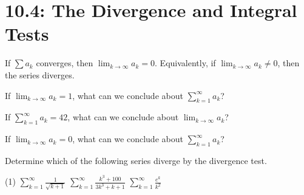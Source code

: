 \documentclass[../mathNotesPreamble]{subfiles}
\begin{document}
  \section{10.4: The Divergence and Integral Tests}

  \begin{thmBox*}
    If $\sum a_k$ converges, then $\displaystyle\lim_{k\to \infty} a_k=0$. Equivalently, if $\displaystyle\lim_{k\to \infty} a_k\neq 0$, then the series diverges.
  \end{thmBox*}
  \begin{ex*}
    If $\displaystyle\lim_{k\to \infty} a_k=1$, what can we conclude about $\displaystyle\sum_{k=1}^\infty a_k$?
  \end{ex*}
  \begin{ex*}
    If $\displaystyle\sum_{k=1}^\infty a_k=42$, what can we conclude about $\displaystyle\lim_{k\to \infty} a_k$?
  \end{ex*}
  \begin{ex*}
    If $\displaystyle \lim_{k\to \infty} a_k=0$, what can we conclude about $\displaystyle\sum_{k=1}^\infty a_k$?
  \end{ex*}
  \pagebreak

  \begin{ex*}
    Determine which of the following series diverge by the divergence test.
  \end{ex*}
  \begin{tasks}[after-item-skip=\stretch{1}, label=,item-indent=0pt](1)
    \task $\displaystyle\sum_{k=1}^\infty \frac{1}{\sqrt{k+1}}$
    \task $\displaystyle\sum_{k=1}^\infty \frac{k^3+100}{3k^3+k+1}$
    \task $\displaystyle\sum_{k=1}^\infty \frac{e^k}{k^2}$
  \end{tasks}
  \pagebreak
\end{document}
